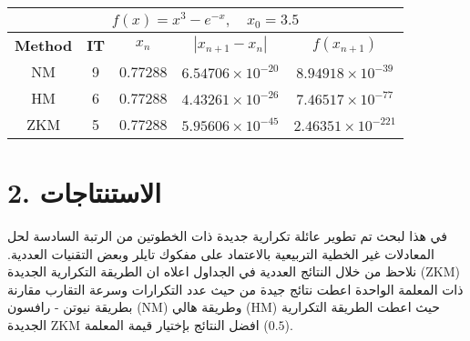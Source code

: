\vspace{1cm}
\begin{table}[H]
	\caption{}
	\renewcommand{\arraystretch}{1.5}
	\centering
	\begin{english}
		\begin{tabular}{|c|c|c|c|c|}
			\hline
			\multicolumn{5}{|c|}{$f(x) = x^3 - e^{-x}, \quad x_0 = 3.5$}\\
			\hline
			\textbf{Method} & \textbf{IT} & $x_n$ & $|x_{n+1}-x_n|$& $f(x_{n+1})$ \\
			\hline
			NM & 9 & 0.77288 & $6.54706\times 10^{-20}$ & $8.94918\times 10^{-39}$\\
			HM & 6 & 0.77288 & $4.43261\times 10^{-26}$ & $7.46517\times 10^{-77}$\\
			ZKM & 5 & 0.77288 & $5.95606\times10^{-45}$ & $2.46351 \times10^{-221}$\\
			\hline
		\end{tabular}
	\end{english}
\end{table}
\newpage
\section*{2. الاستنتاجات}
في هذا لبحث تم تطوير عائلة تكرارية جديدة ذات الخطوتين من الرتبة السادسة لحل المعادلات غير الخطية التربيعية بالاعتماد على مفكوك تايلر وبعض التقنيات العددية. نلاحظ من خلال النتائج العددية في الجداول اعلاه ان الطريقة التكرارية الجديدة (ZKM) ذات المعلمة الواحدة اعطت نتائج جيدة من حيث عدد التكرارات وسرعة التقارب مقارنة بطريقة نيوتن - رافسون (NM) وطريقة هالي (HM) حيث اعطت الطريقة التكرارية الجديدة ZKM افضل النتائج بإختيار قيمة المعلمة ($0.5$).


